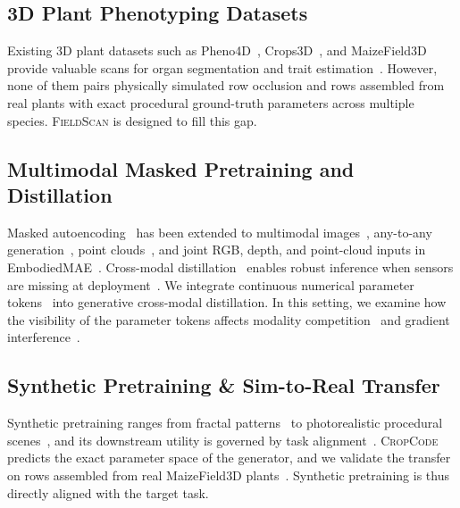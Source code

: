 \documentclass[10pt,twocolumn,letterpaper]{article}
\newcommand{\method}{\textup{\textsc{CropCode}}}   %
\newcommand{\dataset}{\textup{\textsc{FieldScan}}}
\begin{document}
\subsection{3D Plant Phenotyping Datasets}
Existing 3D plant datasets such as Pheno4D~\citep{schunck2021pheno4d}, Crops3D~\citep{crops3d2024}, and MaizeField3D~\citep{maizefield3d2025} provide valuable scans for organ segmentation and trait estimation~\citep{qi2017pointnet,qi2017pointnetpp,arshad2024nerf_field}. However, none of them pairs physically simulated row occlusion and rows assembled from real plants with exact procedural ground-truth parameters across multiple species. \dataset{} is designed to fill this gap.

\subsection{Multimodal Masked Pretraining and Distillation}
Masked autoencoding~\citep{he2022mae} has been extended to multimodal images~\citep{bachmann2022multimae}, any-to-any generation~\citep{mizrahi2023fourm,bachmann2024fourm21}, point clouds~\citep{pang2022pointmae}, and joint RGB, depth, and point-cloud inputs in EmbodiedMAE~\citep{dong2025embodiedmae}. Cross-modal distillation~\citep{hinton2015distillation} enables robust inference when sensors are missing at deployment~\citep{wang2024robustmissing}. We integrate continuous numerical parameter tokens~\citep{golkar2023xval} into generative cross-modal distillation. In this setting, we examine how the visibility of the parameter tokens affects modality competition~\citep{peng2022ogm} and gradient interference~\citep{yu2020pcgrad,chen2018gradnorm}.

\subsection{Synthetic Pretraining \& Sim-to-Real Transfer}
Synthetic pretraining ranges from fractal patterns~\citep{kataoka2020fractaldb} to photorealistic procedural scenes~\citep{raistrick2023infinigen,greff2022kubric,tobin2017domainrand}, and its downstream utility is governed by task alignment~\citep{fan2023intriguing,alemohammad2023mad}. \method{} predicts the exact parameter space of the generator, and we validate the transfer on rows assembled from real MaizeField3D plants~\citep{maizefield3d2025}. Synthetic pretraining is thus directly aligned with the target task.
\end{document}
